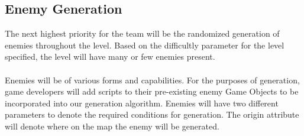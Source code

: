 \documentclass[pdftex,12pt,letter]{article}
\begin{document}
\subsection{Enemy Generation}
The next highest priority for the team will be the randomized generation of enemies throughout the level. Based on the difficultly parameter for the level specified, the level will have many or few enemies present. 
\\\\
Enemies will be of various forms and capabilities. For the purposes of generation, game developers will add scripts to their pre-existing enemy Game Objects to be incorporated into our generation algorithm. Enemies will have two different parameters to denote the required conditions for generation. The origin attribute will denote where on the map the enemy will be generated. 
\end{document}
